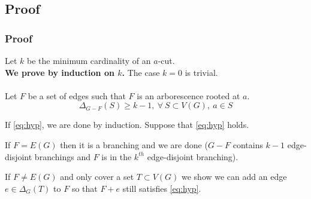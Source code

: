 \documentclass[8pt]{beamer}
\begin{document}
\subsection{Proof}
\begin{frame}
\frametitle{Proof}

Let $k$ be the minimum cardinality of an $a$-cut.\\
\textbf{We prove by induction on $k$.}
The case $k = 0$ is trivial.\\~\\


Let $F$ be a set of edges such that $F$ is an arborescence rooted at $a$.
\begin{equation}
    \Delta_{G-F}(S) \ge k-1,\ \forall\ S \subset V(G),\ a\in S  \label{eq:hyp}
\end{equation}

If \eqref{eq:hyp}, we are done by induction.
Suppose that \eqref{eq:hyp} holds.

If $F = E(G)$ then it is a branching and we are done ($G-F$ contains $k-1$ edge-disjoint branchings and $F$ is in the $k^{th}$ edge-disjoint branching).

If $F \neq E(G)$ and only cover a set $T \subset V(G)$ 
we show we can add an edge $e \in \Delta_G(T)$ to $F$ so that $F + e$ still satisfies \eqref{eq:hyp}.


\end{frame}
\end{document}
